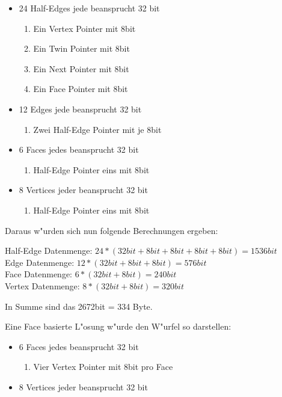 \documentclass[pagesize, paper=a4, fontsize=12pt,titlepage=true, headings=small, headnosepline, abstractoff, liststotoc, nochapterprefix, plainheadsepline]{scrreprt}
\begin{document}
\begin{itemize}
\item 24 Half-Edges jede beansprucht 32 bit
	\begin{enumerate}
    	\item Ein Vertex Pointer mit 8bit
    	\item Ein Twin Pointer mit 8bit
    	\item Ein Next Pointer mit 8bit
    	\item Ein Face Pointer mit 8bit
	\end{enumerate}
\item 12 Edges jede beansprucht 32 bit
	\begin{enumerate}
    	\item Zwei Half-Edge Pointer mit je 8bit
	\end{enumerate}
\item 6 Faces jedes beansprucht 32 bit
	\begin{enumerate}
    	\item Half-Edge Pointer eins mit 8bit
	\end{enumerate}
\item 8 Vertices jeder beansprucht 32 bit
	\begin{enumerate}
    	\item Half-Edge Pointer eins mit 8bit
	\end{enumerate}
\end{itemize}

Daraus w"urden sich nun folgende Berechnungen ergeben:

	Half-Edge Datenmenge: \begin{math}24 * (32bit+ 8bit + 8bit + 8bit + 8bit) = 1536bit\end{math}
	\\
	Edge Datenmenge: \begin{math}12 * (32bit + 8bit + 8bit) = 576bit\end{math}
	\\
	Face Datenmenge: \begin{math}6 * (32bit + 8bit) = 240bit\end{math}
	\\
	Vertex Datenmenge: \begin{math}8 * (32bit + 8bit) = 320bit\end{math}

	In Summe sind das 2672bit = 334 Byte.
\newline

Eine Face basierte L"osung w"urde den W"urfel so darstellen:
\begin{itemize}
\item 6 Faces jedes beansprucht 32 bit
	\begin{enumerate}
    	\item Vier Vertex Pointer mit 8bit pro Face
	\end{enumerate}
\item 8 Vertices jeder beansprucht 32 bit
\end{itemize}
\end{document}
